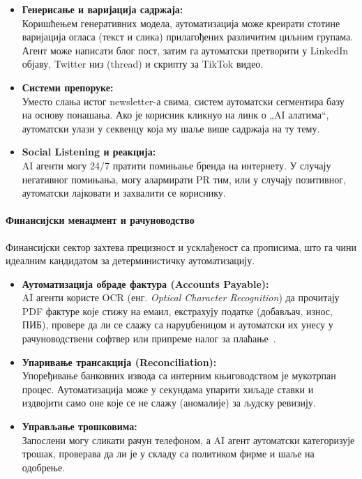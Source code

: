 \begin{itemize}
    \item \textbf{Генерисање и варијација садржаја:} \\
    Коришћењем генеративних модела, аутоматизација може креирати стотине варијација огласа (текст и слика) прилагођених различитим циљним групама. Агент може написати блог пост, затим га аутоматски претворити у LinkedIn објаву, Twitter низ (thread) и скрипту за TikTok видео.
    
    \item \textbf{Системи препоруке:} \\
    Уместо слања истог newsletter-а свима, систем аутоматски сегментира базу на основу понашања. Ако је корисник кликнуо на линк о „AI алатима“, аутоматски улази у секвенцу која му шаље више садржаја на ту тему.
    
    \item \textbf{Social Listening и реакција:} \\
    AI агенти могу 24/7 пратити помињање бренда на интернету. У случају негативног помињања, могу алармирати PR тим, или у случају позитивног, аутоматски лајковати и захвалити се кориснику.
\end{itemize}

\paragraph{Финансијски менаџмент и рачуноводство}
\noindent
Финансијски сектор захтева прецизност и усклађеност са прописима, што га чини идеалним кандидатом за детерминистичку аутоматизацију.

\begin{itemize}
    \item \textbf{Аутоматизација обраде фактура (Accounts Payable):} \\
    AI агенти користе OCR (енг. \textit{Optical Character Recognition}) да прочитају PDF фактуре које стижу на емаил, екстрахују податке (добављач, износ, ПИБ), провере да ли се слажу са наруџбеницом и аутоматски их унесу у рачуноводствени софтвер или припреме налог за плаћање~\cite{schwab2017}.
    
    \item \textbf{Упаривање трансакција (Reconciliation):} \\
    Упоређивање банковних извода са интерним књиговодством је мукотрпан процес. Аутоматизација може у секундама упарити хиљаде ставки и издвојити само оне које се не слажу (аномалије) за људску ревизију.
    
    \item \textbf{Управљање трошковима:} \\
    Запослени могу сликати рачун телефоном, а AI агент аутоматски категоризује трошак, проверава да ли је у складу са политиком фирме и шаље на одобрење.
\end{itemize}

